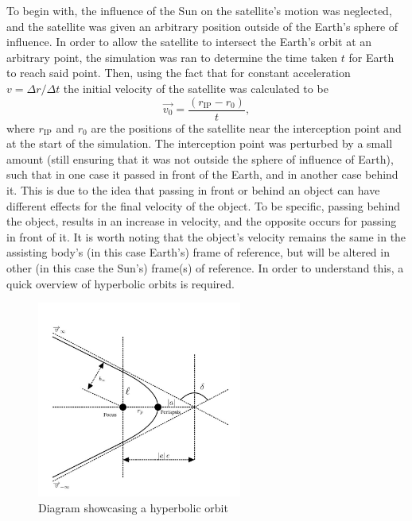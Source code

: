\documentclass[12pt, english]{report}
\begin{document}
{To begin with, the influence of the Sun on the satellite's motion was neglected, and the satellite was given an arbitrary position outside of the Earth's sphere of influence. In order to allow the satellite to intersect the Earth's orbit at an arbitrary point, the simulation was ran to determine the time taken $t$ for Earth to reach said point. Then, using the fact that for constant acceleration $v = \Delta r / \Delta t$ the initial velocity of the satellite was calculated to be 
\begin{equation}
    \vec{v_0} = \frac{(r_{\mathrm{IP}} - r_0)}{t},
\end{equation}
\indent where $r_{\mathrm{IP}}$ and $r_0$ are the positions of the satellite near the interception point and at the start of the simulation. The interception point was perturbed by a small amount (still ensuring that it was not outside the sphere of influence of Earth), such that in one case it passed in front of the Earth, and in another case behind it. This is due to the idea that passing in front or behind an object can have different effects for the final velocity of the object. To be specific, passing behind the object, results in an increase in velocity, and the opposite occurs for passing in front of it. It is worth noting that the object's velocity remains the same in the assisting body's (in this case Earth's) frame of reference, but will be altered in other (in this case the Sun's) frame(s) of reference. In order to understand this, a quick overview of hyperbolic orbits is required.
\begin{figure}[ht]
    \centering
    \includegraphics[width=0.6\textwidth]{graphics/Orbits.jpg}
    \caption{Diagram showcasing a hyperbolic orbit}
    \label{fig:hyp_orbit}
\end{figure}

}
\end{document}
